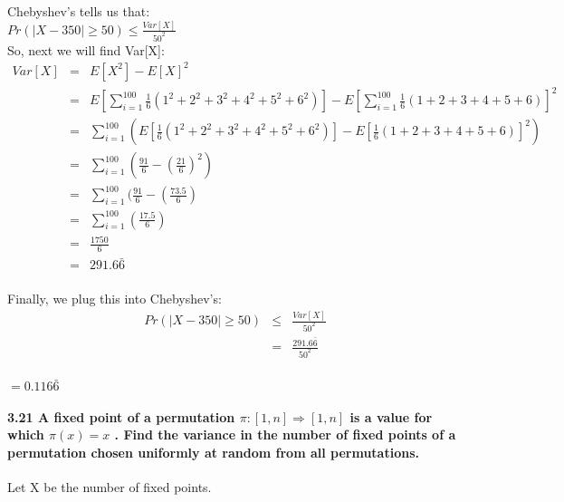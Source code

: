 \documentclass{article}
\begin{document}
Chebyshev's tells us that: \\

${ Pr(|X - 350| \geq 50) \leq \frac{Var[X]}{50^2} }$ \\

So, next we will find Var[X]: \\

\begin{eqnarray*}
    Var[X] & = & E[X^2] - E[X]^2 \\
           & = & E[ \sum_{i=1}^{100} \frac{1}{6} ( 1^2 + 2^2 + 3^2 + 4^2 + 5^2 + 6^2) ] - E[ \sum_{i=1}^{100} \frac{1}{6} ( 1 + 2 + 3 + 4 + 5 + 6) ]^2 \\
           & = & \sum_{i=1}^{100} ( E[ \frac{1}{6} ( 1^2 + 2^2 + 3^2 + 4^2 + 5^2 + 6^2) ] - E[\frac{1}{6} ( 1 + 2 + 3 + 4 + 5 + 6) ]^2 ) \\
           & = & \sum_{i=1}^{100} ( \frac{91}{6} - ( \frac{21}{6} )^2 ) \\
           & = & \sum_{i=1}^{100} ( \frac{91}{6} - ( \frac{73.5}{6} ) \\
           & = & \sum_{i=1}^{100} ( \frac{17.5}{6} ) \\
           & = & \frac{1750}{6} \\
           & = & 291.6\bar{6}  \\
\end{eqnarray*}

Finally, we plug this into Chebyshev's: \\

\begin{eqnarray*}
    Pr(| X - 350| \geq 50) & \leq & \frac{Var[X]}{50^2} \\
                             & = & \frac{291.6\bar{6}}{50^2} \\
\end{eqnarray*}
\begin{center}
    $\boxed{=0.116\bar{6}}$
\end{center}

\paragraph{3.21 A fixed point of a permutation ${\pi : [1,n] \Rightarrow [1,n]}$ 
is a value for which ${\pi (x) = x}$ . Find the variance in the number of fixed
points of a permutation chosen uniformly at random from all permutations.}

Let X be the number of fixed points. \\
\end{document}
